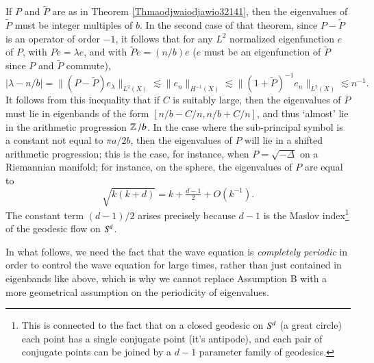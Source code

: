 If $P$ and $\tilde{P}$ are as in Theorem \ref{Thmaodjwaiodjawio32141}, then the eigenvalues of $\tilde{P}$ must be integer multiples of $b$. In the second case of that theorem, since $P - \tilde{P}$ is an operator of order $-1$, it follows that for any $L^2$ normalized eigenfunction $e$ of $P$, with $P e = \lambda e$, and with $\tilde{P} e = (n / b) e$ ($e$ must be an eigenfunction of $\tilde{P}$ since $P$ and $\tilde{P}$ commute),
%
\begin{equation}
  |\lambda - n / b| = \| (P - \tilde{P}) e_\lambda \|_{L^2(X)} \lesssim \| e_n \|_{H^{-1}(X)} \lesssim \| (1 + \tilde{P})^{-1} e_n \|_{L^2(X)} \lesssim n^{-1}.
\end{equation}
%
It follows from this inequality that if $C$ is suitably large, then the eigenvalues of $P$ must lie in eigenbands of the form $[n/b - C/n, n/b + C/n]$, and thus `almost' lie in the arithmetic progression $\operatorname{\mathbb{Z}} / b$. In the case where the sub-principal symbol is a constant not equal to $\pi a / 2b$, then the eigenvalues of $P$ will lie in a shifted arithmetic progression; this is the case, for instance, when $P = \sqrt{-\Delta}$ on a Riemannian manifold; for instance, on the sphere, the eigenvalues of $P$ are equal to
%
\begin{equation}
  \sqrt{k(k+d)} = k + \tfrac{d-1}{2} + O(k^{-1}).
\end{equation}
%
The constant term $(d-1)/2$ arises precisely because $d - 1$ is the Maslov index\footnote{This is connected to the fact that on a closed geodesic on ${S}^{\!{d}}$ (a great circle) each point has a single conjugate point (it's antipode), and each pair of conjugate points can be joined by a $d-1$ parameter family of geodesics.} of the geodesic flow on ${S}^{\!{d}}$.

In what follows, we need the fact that the wave equation is \emph{completely periodic} in order to control the wave equation for large times, rather than just contained in eigenbands like above, which is why we cannot replace Assumption B with a more geometrical assumption on the periodicity of eigenvalues.